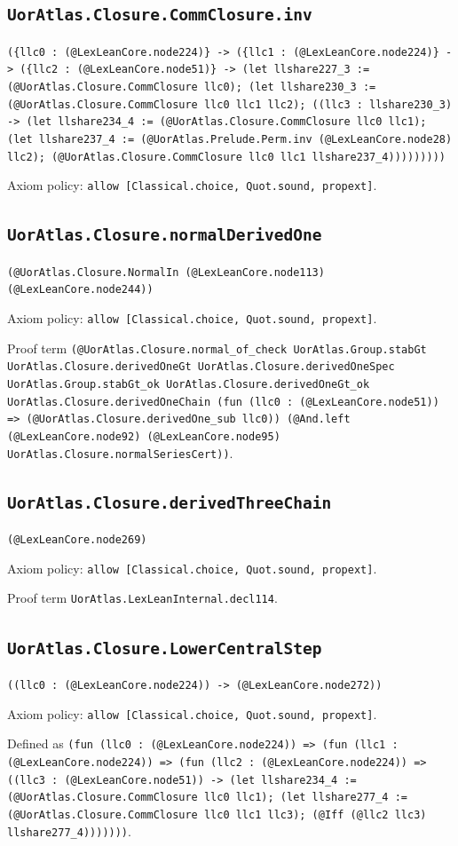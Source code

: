 \documentclass[11pt]{article}
\begin{document}
\subsection*{\texttt{UorAtlas.Closure.CommClosure.inv}}
\noindent\texttt{(\{llc0 : (@LexLeanCore.node224)\} -> (\{llc1 : (@LexLeanCore.node224)\} -> (\{llc2 : (@LexLeanCore.node51)\} -> (let llshare227\_3 := (@UorAtlas.Closure.CommClosure llc0); (let llshare230\_3 := (@UorAtlas.Closure.CommClosure llc0 llc1 llc2); ((llc3 : llshare230\_3) -> (let llshare234\_4 := (@UorAtlas.Closure.CommClosure llc0 llc1); (let llshare237\_4 := (@UorAtlas.Prelude.Perm.inv (@LexLeanCore.node28) llc2); (@UorAtlas.Closure.CommClosure llc0 llc1 llshare237\_4)))))))))}\par
\noindent Axiom policy: \texttt{allow [Classical.choice, Quot.sound, propext]}.\par
\subsection*{\texttt{UorAtlas.Closure.normalDerivedOne}}
\noindent\texttt{(@UorAtlas.Closure.NormalIn (@LexLeanCore.node113) (@LexLeanCore.node244))}\par
\noindent Axiom policy: \texttt{allow [Classical.choice, Quot.sound, propext]}.\par
\noindent Proof term \texttt{(@UorAtlas.Closure.normal\_of\_check UorAtlas.Group.stabGt UorAtlas.Closure.derivedOneGt UorAtlas.Closure.derivedOneSpec UorAtlas.Group.stabGt\_ok UorAtlas.Closure.derivedOneGt\_ok UorAtlas.Closure.derivedOneChain (fun (llc0 : (@LexLeanCore.node51)) => (@UorAtlas.Closure.derivedOne\_sub llc0)) (@And.left (@LexLeanCore.node92) (@LexLeanCore.node95) UorAtlas.Closure.normalSeriesCert))}.\par
\subsection*{\texttt{UorAtlas.Closure.derivedThreeChain}}
\noindent\texttt{(@LexLeanCore.node269)}\par
\noindent Axiom policy: \texttt{allow [Classical.choice, Quot.sound, propext]}.\par
\noindent Proof term \texttt{UorAtlas.LexLeanInternal.decl114}.\par
\subsection*{\texttt{UorAtlas.Closure.LowerCentralStep}}
\noindent\texttt{((llc0 : (@LexLeanCore.node224)) -> (@LexLeanCore.node272))}\par
\noindent Axiom policy: \texttt{allow [Classical.choice, Quot.sound, propext]}.\par
\noindent Defined as \texttt{(fun (llc0 : (@LexLeanCore.node224)) => (fun (llc1 : (@LexLeanCore.node224)) => (fun (llc2 : (@LexLeanCore.node224)) => ((llc3 : (@LexLeanCore.node51)) -> (let llshare234\_4 := (@UorAtlas.Closure.CommClosure llc0 llc1); (let llshare277\_4 := (@UorAtlas.Closure.CommClosure llc0 llc1 llc3); (@Iff (@llc2 llc3) llshare277\_4)))))))}.\par
\end{document}
